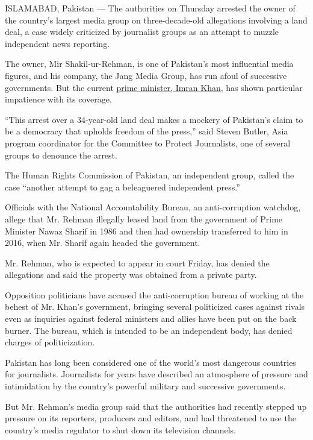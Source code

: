 ISLAMABAD, Pakistan --- The authorities on Thursday arrested the owner
of the country's largest media group on three-decade-old allegations
involving a land deal, a case widely criticized by journalist groups as
an attempt to muzzle independent news reporting.

The owner, Mir Shakil-ur-Rehman, is one of Pakistan's most influential
media figures, and his company, the Jang Media Group, has run afoul of
successive governments. But the current
\href{https://www.nytimes.com/2020/06/26/world/asia/pakistan-imran-khan-bin-laden-martyr.html}{prime
minister, Imran Khan}, has shown particular impatience with its
coverage.

``This arrest over a 34-year-old land deal makes a mockery of Pakistan's
claim to be a democracy that upholds freedom of the press,'' said Steven
Butler, Asia program coordinator for the Committee to Protect
Journalists, one of several groups to denounce the arrest.

The Human Rights Commission of Pakistan, an independent group, called
the case ``another attempt to gag a beleaguered independent press.''

Officials with the National Accountability Bureau, an anti-corruption
watchdog, allege that Mr. Rehman illegally leased land from the
government of Prime Minister Nawaz Sharif in 1986 and then had ownership
transferred to him in 2016, when Mr. Sharif again headed the government.

Mr. Rehman, who is expected to appear in court Friday, has denied the
allegations and said the property was obtained from a private party.

Opposition politicians have accused the anti-corruption bureau of
working at the behest of Mr. Khan's government, bringing several
politicized cases against rivals even as inquiries against federal
ministers and allies have been put on the back burner. The bureau, which
is intended to be an independent body, has denied charges of
politicization.

Pakistan has long been considered one of the world's most dangerous
countries for journalists. Journalists for years have described an
atmosphere of pressure and intimidation by the country's powerful
military and successive governments.

But Mr. Rehman's media group said that the authorities had recently
stepped up pressure on its reporters, producers and editors, and had
threatened to use the country's media regulator to shut down its
television channels.

